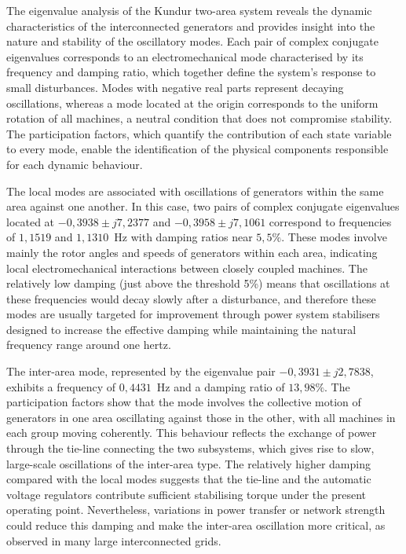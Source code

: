 The eigenvalue analysis of the Kundur two-area system reveals the dynamic characteristics of the interconnected generators and 
provides insight into the nature and stability of the oscillatory modes. Each pair of complex conjugate eigenvalues corresponds to an 
electromechanical mode characterised by its frequency and damping ratio, which together define the system's response to
 small disturbances. Modes with negative real parts represent decaying oscillations, whereas a mode located at the origin 
 corresponds to the uniform rotation of all machines, a neutral condition that does not compromise stability. 
 The participation factors, which quantify the contribution of each state variable to every mode, enable the identification of the 
 physical components responsible for each dynamic behaviour.

The local modes are associated with oscillations of generators within the same area against one another. 
In this case, two pairs of complex conjugate eigenvalues located at $-0,3938 \pm j7,2377$ and $-0,3958 \pm j7,1061$ correspond to frequencies
 of $1,1519$ and $1,1310$~Hz with damping ratios near $5,5\%$. These modes involve mainly the rotor angles and 
 speeds of generators within each area, indicating local electromechanical interactions between closely coupled machines. 
 The relatively low damping (just above the threshold 5\%) means that oscillations at these frequencies would decay slowly after a 
 disturbance, and therefore these modes are usually targeted for improvement through power system stabilisers designed to increase 
 the effective damping while maintaining the natural frequency range around one hertz.

The inter-area mode, represented by the eigenvalue pair $-0,3931 \pm j2,7838$, exhibits a frequency of  $0,4431$~Hz and a damping 
ratio of $13,98\%$. The participation factors show that the mode involves the collective motion of generators in one area oscillating 
against those in the other, with all machines in each group moving coherently. This behaviour reflects the exchange of power 
through the tie-line connecting the two subsystems, which gives rise to slow, large-scale oscillations of the inter-area type. 
The relatively higher damping compared with the local modes suggests that the tie-line and the automatic voltage regulators 
contribute sufficient stabilising torque under the present operating point. Nevertheless, variations in power transfer or network 
strength could reduce this damping and make the inter-area oscillation more critical, as observed in many large interconnected grids.

